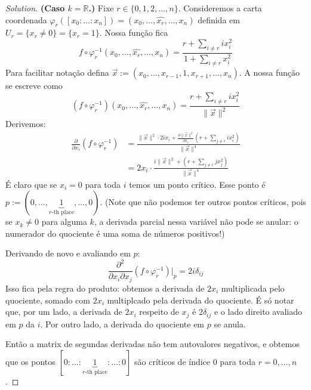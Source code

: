 \begin{proof}[Solution]\leavevmode
	\textbf{(Caso \(k=\mathbb{R}\).)} Fixe \(r \in \{0,1,2,\ldots,n\}\). Consideremos a carta coordenada \(\varphi_r([x_0:\ldots:x_n])	= (x_0,\ldots,\widehat{x_r},\ldots,x_n)\) definida em \(U_r=\{x_r \neq 0\}=\{x_r=1\}\). Nossa função fica
	\[f \circ \varphi_r^{-1}(x_0,\ldots,\widehat{x_r},\ldots,x_n)=\frac{r+\sum_{i\neq r}ix_i^2}{1+\sum_{i\neq r}x_i^2}\]
Para facilitar notação defina \(\vec{x}:=(x_0,\ldots,x_{r-1},1,x_{r+1},\ldots,x_n)\). A nossa função se escreve como
\[(f \circ \varphi_r^{-1})(x_0,\ldots,\widehat{x_r},\ldots,x_n)=\frac{r+\sum_{i\neq r}ix_i^2}{\|\vec{x}\|^2}\]
Derivemos:
\begin{align*}
\frac{\partial }{\partial x_i}(f \circ \varphi_r^{-1})&=\frac{\|\vec{x}\|^2\cdot 2ix_i+\frac{\partial \|\vec{x}\|^2}{\partial x_i}\left(r+\sum_{j \neq r}ix_i^2\right) }{\|\vec{x}\|^4}\\
&=2x_i\cdot  \frac{i \|\vec{x}\|^2+\left(r+\sum_{j \neq r}jx_j^2\right) }{\|\vec{x}\|^4}
\end{align*}
É claro que se \(x_i=0\) para toda \(i\) temos um ponto crítico. Esse ponto é \(p:=(0,\ldots,\underbrace{1}_{r\text{-th place} },\ldots,0)\). (Note que não podemos ter outros pontos críticos, pois se \(x_k \neq 0\) para alguma \(k\), a derivada parcial nessa variável não pode se anular: o numerador do quociente é uma soma de números positivos!)

Derivando de novo e avaliando em \(p\):
\[\frac{\partial ^2}{\partial x_i\partial x_j}(f \circ \varphi_r^{-1})\Big|_{p}=2i\delta_{ij}\]
Isso fica pela regra do produto: obtemos a derivada de \(2x_i\) multiplicada pelo quociente, somado com \(2x_i\) multiplcado pela derivada do quociente. É só notar que, por um lado, a derivada de \(2x_i\) respeito de \(x_j\) é \(2\delta_{ij}\) e o lado direito avaliado em \(p\) da \(i\). Por outro lado, a derivada do quociente em \(p\) se anula.

Então a matrix de segundas derivadas não tem autovalores negativos, e obtemos que os pontos \([0:\ldots:\underbrace{1}_{r\text{-th place} }:\ldots:0]\) são críticos de índice 0 para toda \(r=0,\ldots,n\).

\end{proof}

